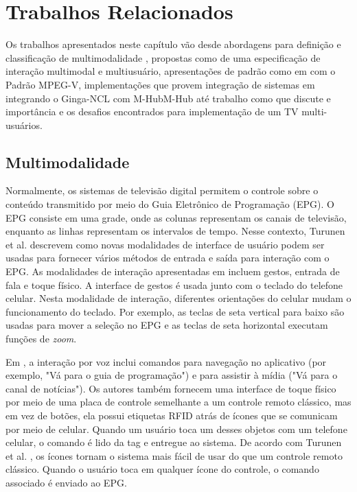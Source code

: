 \chapter{Trabalhos Relacionados} \label{cap:cap3}

Os trabalhos apresentados neste capítulo vão desde abordagens para definição e classificação de multimodalidade  \cite{turunen2009multimodal}, propostas como \cite{guedes2016extending} de uma especificação de interação multimodal e multiusuário, apresentações de padrão como em \cite{Kim:2014aa} com o Padrão MPEG-V, implementações que provem integração de sistemas em \cite{pereira2017middleware} integrando o Ginga-NCL com M-HubM-Hub \cite{talavera2015mobile} até trabalho como \cite{mcgill2015review} que discute e importância e os desafios encontrados para implementação de um TV multi-usuários.  

\section {Multimodalidade}

Normalmente, os sistemas de televisão digital permitem o controle sobre o conteúdo transmitido por meio do Guia Eletrônico de Programação (EPG). O EPG consiste em uma grade, onde as colunas representam os canais de televisão, enquanto as linhas representam os intervalos de tempo. Nesse contexto, Turunen et al. \cite{turunen2009multimodal} descrevem como novas modalidades de interface de usuário podem ser usadas para fornecer vários métodos de entrada e saída para interação com o EPG. As modalidades de interação apresentadas em \cite{turunen2009multimodal} incluem gestos, entrada de fala e toque físico. A interface de gestos é usada junto com o teclado do telefone celular. Nesta modalidade de interação, diferentes orientações do celular mudam o funcionamento do teclado. Por exemplo, as teclas de seta vertical para baixo são usadas para mover a seleção no EPG e as teclas de seta horizontal executam funções de \textit{zoom}.

Em \cite{turunen2009multimodal}, a interação por voz inclui comandos para navegação no aplicativo (por exemplo, "Vá para o guia de programação") e para assistir à mídia ("Vá para o canal de notícias"). Os autores também fornecem uma interface de toque físico por meio de uma placa de controle semelhante a um controle remoto clássico, mas em vez de botões, ela possui etiquetas RFID atrás de ícones que se comunicam por meio de celular. Quando um usuário toca um desses objetos com um telefone celular, o comando é lido da tag e entregue ao sistema. De acordo com Turunen et al. \cite{turunen2009multimodal}, os ícones tornam o sistema mais fácil de usar do que um controle remoto clássico. Quando o usuário toca em qualquer ícone do controle, o comando associado é enviado ao EPG.

